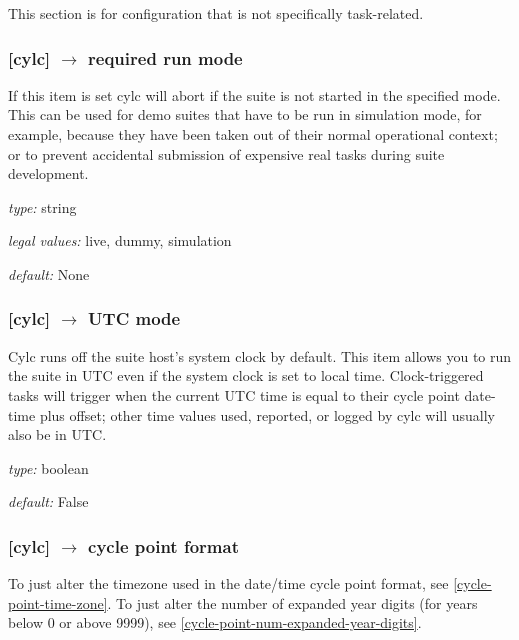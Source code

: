 This section is for configuration that is not specifically task-related.

\subsubsection[required run mode]{ [cylc] $\rightarrow$ required run mode}

If this item is set cylc will abort if the suite is not started in the
specified mode. This can be used for demo suites that have to be
run in simulation mode, for example, because they have been taken out of
their normal operational context; or to prevent accidental submission of
expensive real tasks during suite development.
\begin{myitemize}
    \item {\em type:} string
    \item {\em legal values:} live, dummy, simulation
    \item {\em default:} None
\end{myitemize}

\subsubsection[UTC mode]{ [cylc] $\rightarrow$ UTC mode}
\label{UTC-mode}

Cylc runs off the suite host's system clock by default. This item allows
you to run the suite in UTC even if the system clock is set to local time.
Clock-triggered tasks will trigger when the current UTC time is equal to
their cycle point date-time plus offset; other time values used, reported,
or logged by cylc will usually also be in UTC.

\begin{myitemize}
    \item {\em type:} boolean
    \item {\em default:} False
\end{myitemize}

\subsubsection[cycle point format]{ [cylc] $\rightarrow$ cycle point format}
\label{cycle-point-format}

To just alter the timezone used in the date/time cycle point format, see
\ref{cycle-point-time-zone}. To just alter the number of expanded year digits
(for years below 0 or above 9999), see
\ref{cycle-point-num-expanded-year-digits}.

